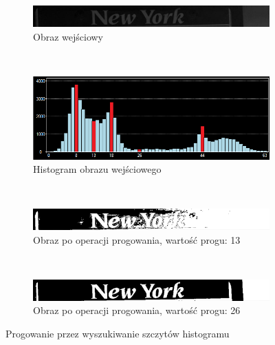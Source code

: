 \begin{figure}
  \centering
  \begin{subfigure}[b]{0.8\textwidth}
    \includegraphics[width=\textwidth]{img/histogram-peaks-input}
    \caption{Obraz wejściowy}
    \label{fig:histogram_peaks_input}
  \end{subfigure}
  ~
  \begin{subfigure}[b]{0.8\textwidth}
    \includegraphics[width=\textwidth]{img/histogram-peaks-histogram}
    \caption{Histogram obrazu wejściowego}
    \label{fig:histogram_peaks_histogram}
  \end{subfigure}
  ~
  \begin{subfigure}[b]{0.45\textwidth}
    \includegraphics[width=\textwidth]{img/histogram-peaks-bad}
    \caption{Obraz po operacji progowania, wartość progu: 13}
    \label{fig:histogram_peaks_bad}
  \end{subfigure}
  ~
  \begin{subfigure}[b]{0.45\textwidth}
    \includegraphics[width=\textwidth]{img/histogram-peaks-good}
    \caption{Obraz po operacji progowania, wartość progu: 26}
    \label{fig:histogram_peaks_good}
  \end{subfigure}
  \caption{Progowanie przez wyszukiwanie szczytów histogramu}\label{fig:histogram_peaks}
\end{figure}

